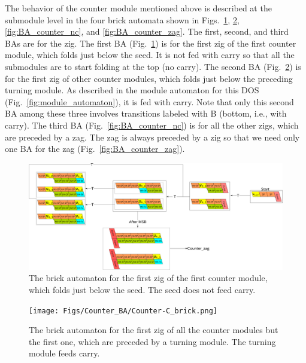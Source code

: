 \documentclass[dvipdfmx,review]{elsarticle}
\begin{document}
The behavior of the counter module mentioned above is described at the submodule level in the four brick automata shown in Figs.~\ref{fig:BA_counter_nc_seed}, \ref{fig:BA_counter_c}, \ref{fig:BA_counter_nc}, and \ref{fig:BA_counter_zag}. 
The first, second, and third BAs are for the zig. 
The first BA (Fig.~\ref{fig:BA_counter_nc_seed}) is for the first zig of the first counter module, which folds just below the seed. 
It is not fed with carry so that all the submodules are to start folding at the top (no carry). 
The second BA (Fig.~\ref{fig:BA_counter_c}) is for the first zig of other counter modules, which folds just below the preceding turning module. 
As described in the module automaton for this DOS (Fig.~\ref{fig:module_automaton}), it is fed with carry. 
Note that only this second BA among these three involves transitions labeled with B (bottom, i.e., with carry). 
The third BA (Fig.~\ref{fig:BA_counter_nc}) is for all the other zigs, which are preceded by a zag. 
The zag is always preceded by a zig so that we need only one BA for the zag (Fig.~\ref{fig:BA_counter_zag}). 

\begin{figure}[ht]
\centering
\includegraphics[width=\linewidth]{Figs/Counter_BA/Counter-NC_seed_brick.png}
\caption{The brick automaton for the first zig of the first counter module, which folds just below the seed.
The seed does not feed carry.}
\label{fig:BA_counter_nc_seed}
\end{figure}

\begin{figure}[ht]
\centering
\texttt{[image: Figs/Counter\_BA/Counter-C\_brick.png]}
\caption{The brick automaton for the first zig of all the counter modules but the first one, which are preceded by a turning module.
The turning module feeds carry.
}
\label{fig:BA_counter_c}
\end{figure}
\end{document}

